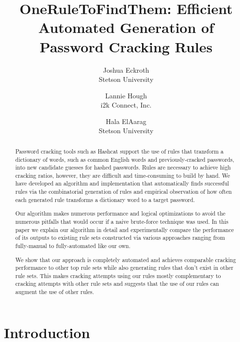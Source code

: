 \documentclass[letterpaper,twocolumn,10pt]{article}
\begin{document}
\date{}

\title{\Large \bf OneRuleToFindThem: Efficient Automated Generation of Password Cracking Rules}

\author{
{\rm Joshua Eckroth}\\
Stetson University
\and
{\rm Lannie Hough}\\
i2k Connect, Inc.
\and
{\rm Hala ElAarag}\\
Stetson University
}

\maketitle

\begin{abstract}
Password cracking tools such as Hashcat support the use of rules that transform
a dictionary of words, such as common English words and previously-cracked
passwords, into new candidate guesses for hashed passwords.
Rules are necessary to achieve high
cracking ratios, however, they are difficult and time-consuming to build by hand. We have
developed an algorithm and implementation that automatically finds successful
rules via the combinatorial generation of rules and empirical observation of how
often each generated rule transforms a dictionary word to a target password.

Our algorithm makes numerous performance and logical optimizations to avoid the
numerous pitfalls that would occur if a naive brute-force technique was used.  In this
paper we explain our algorithm in detail and experimentally compare the performance of
its outputs to existing rule sets constructed via various approaches ranging from
fully-manual to fully-automated like our own.

We show that our approach is completely automated and achieves comparable
cracking performance to other top rule sets while also generating rules
that don't exist in other rule sets. This makes cracking attempts using our
rules mostly complementary to cracking attempts with other rule sets and
suggests that the use of our rules can augment the use of other rules.

\end{abstract}


\section{Introduction}
\end{document}
